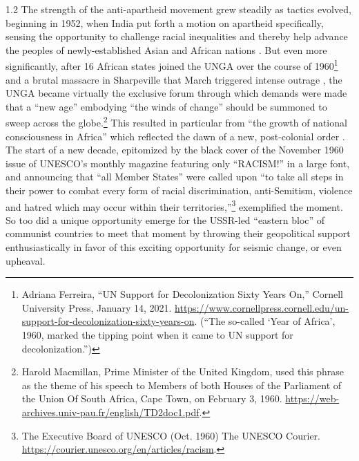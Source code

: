 \documentclass[../unravbook.tex]{subfiles}
\begin{document}
\begin{spacing}{1.2}
The strength of the anti-apartheid movement grew steadily as tactics evolved, beginning in 1952, when India put forth a motion on apartheid specifically, sensing the opportunity to challenge racial inequalities and thereby help advance the peoples of newly-established Asian and African nations \parencite[43]{Klotz-1995}. But even more significantly, after 16 African states joined the UNGA over the course of 1960\footnote{Adriana  Ferreira, \enquote{UN Support for Decolonization Sixty Years On,} Cornell University Press, January 14, 2021. \url{https://www.cornellpress.cornell.edu/un-support-for-decolonization-sixty-years-on}. (\enquote{The so-called \enquote{Year of Africa}, 1960, marked the tipping point when it came to UN support for decolonization.})} and a brutal massacre in Sharpeville that March triggered intense outrage \parencite{Lodge-2011}, the UNGA became virtually the exclusive forum through which demands were made that a \enquote{new age} embodying \enquote{the winds of change} should be summoned to sweep across the globe.\footnote{Harold Macmillan, Prime Minister of the United Kingdom, used this phrase as the theme of his speech to Members of both Houses of the Parliament of the Union Of South Africa, Cape Town, on February 3, 1960. \url{https://web-archives.univ-pau.fr/english/TD2doc1.pdf}.} This resulted in particular from \enquote{the growth  of national consciousness in Africa} which reflected the dawn of a new, post-colonial order \parencite[52]{Jensen-2016}. The start of a new decade, epitomized by the black cover of the November 1960 issue of UNESCO's monthly magazine featuring only ``RACISM!'' in a large font, and announcing that ``all Member States'' were called upon ``to take all steps in their power to combat every form of racial discrimination, anti-Semitism, violence and hatred which may occur within their territories,''\footnote{The Executive Board of UNESCO  (Oct. 1960) The UNESCO Courier. \url{https://courier.unesco.org/en/articles/racism}.} exemplified the moment. So too did a unique opportunity emerge for the USSR-led ``eastern bloc'' of communist countries to meet that moment by throwing their geopolitical support enthusiastically in favor of this exciting opportunity for seismic change, or even upheaval. 


\end{spacing}
\end{document}
